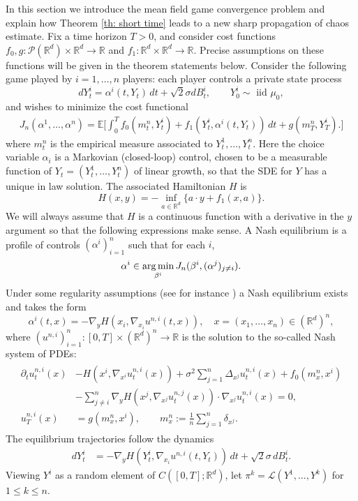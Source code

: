\documentclass[11pt,reqno]{amsart}
\numberwithin{equation}{section}
\theoremstyle{definition}
\def\E{{\mathbb E}}
\def\R{{\mathbb R}}
\def\Law{\mathcal{L}}
\newcommand{\argmin}{\operatornamewithlimits{arg\,min}}
\begin{document}
In this section we introduce the mean field game convergence problem and explain how Theorem \ref{th: short time} leads to a new sharp propagation of chaos estimate.
Fix a time horizon $T > 0$, and consider cost functions $f_0,g: \mathcal P(\R^d)\times \R^d \to \R$ and $f_1:\R^d \times \R^d \to \R$. Precise assumptions on these functions will be given in the theorem statements below. Consider the following game played by $i=1,\dots,n$ players: each player controls a private state process
\begin{equation*}
    dY_t^i = \alpha^i(t,Y_t)\,dt+\sqrt 2 \sigma dB_t^i, \qquad Y_0^i \sim \text{ iid }  \mu_0 ,
\end{equation*}
and wishes to minimize the cost functional
\begin{align*}
    J_n(\alpha^1,\ldots,\alpha^n)= \E\bigg[\int_0^T f_0( m_t^n,Y_t^{i})+f_1(Y_t^{i},\alpha^i(t,Y_t))\,dt+g( m_T^n,Y_T^{i}).\bigg]
\end{align*}
where $m_t^n$ is the empirical measure associated to $Y_t^1,\dots,Y_t^n$. Here the choice variable $\alpha_i$ is a Markovian (closed-loop) control, chosen to be a measurable function of $Y_t=(Y^1_t,\ldots,Y^n_t)$ of linear growth, so that the SDE for $Y$ has a unique in law solution. The associated  Hamiltonian $H$ is
\begin{equation*}
    H(x,y)=-\inf_{a \in \R^d}\{a\cdot y+f_1(x,a)\}.
\end{equation*}
We will always assume that $H$ is a continuous function with a derivative in the $y$ argument so that the following expressions make sense. A Nash equilibrium is a profile of controls $(\alpha^i)_{i =1}^n$ such that for each $i$,
\[
\alpha^i \in \argmin_{\beta^i} J_n( \beta^i, (\alpha^j)_{j\neq i}).
\]
Under some regularity assumptions (see for instance \cite[Proposition 6.26]{CDMFGbook2}) a Nash equilibrium exists and takes the form
\begin{equation}
    \label{eq: controls in a NE}\alpha^i(t,x)= -\nabla_y H(x_i,\nabla_{x_i} u^{n,i}(t,x)), \quad x=(x_1,\ldots,x_n) \in (\R^d)^n,
\end{equation}where $(u^{n,i})_{i=1}^n: [0,T] \times (\R^d)^n\to \R$ is the solution to the so-called Nash system of PDEs:
\begin{align}
\begin{split}
\label{eq: Nash system}
    \partial_t u_t^{n,i}(x)&   - H(x^i,\nabla_{x^i}u^{n,i}_t(x))  +\sigma^2\sum_{j=1}^n \Delta_{x^j} u_t^{n,i}(x) + f_0(m_x^n,x^i) \\
        &- \sum_{j\neq i}^n \nabla_y H(x^j,\nabla_{x^j}u^{n,j}_t(x))\cdot \nabla_{x^j}u_t^{n,i}(x)  =0, \\
    u_T^{n,i}(x)&=g(m_x^n,x^i), \qquad m^n_x := \frac{1}{n}\sum_{j=1}^n\delta_{x^j}.
\end{split}
\end{align}
The equilibrium trajectories follow the dynamics 
\begin{align} 
    \label{eq: trajectories in Nash Equilibrium}
    dY_t^i &= -\nabla_y H(Y_t^i,\nabla_{x_i} u^{n,i}(t,Y_t))\,dt+\sqrt 2 \sigma \,dB_t^i.   
\end{align}
Viewing $Y^i$ as a random element of $C([0,T];\R^d)$, let $\pi^k=\Law(Y^1,\dots,Y^k)$ for $1 \le k \le n$.
\end{document}
